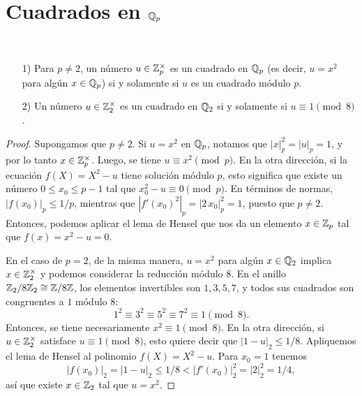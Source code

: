 \documentclass{article}
\numberwithin{equation}{section}
\theoremstyle{definition}
\begin{document}

\section{Cuadrados en $\mathbb{Q}_p$}

\begin{proposicion}
  \label{prop:cuadrados-en-Zp}
  ~

  \begin{enumerate}
  \item[1)] Para $p \ne 2$, un número $u \in \mathbb{Z}_p^\times$ es un cuadrado en
    $\mathbb{Q}_p$ (es decir, $u = x^2$ para algún $x \in \mathbb{Q}_p$) si y solamente si $u$
    es un cuadrado módulo $p$.

  \item[2)] Un número $u\in\mathbb{Z}_2^\times$ es un cuadrado en $\mathbb{Q}_2$ si y solamente
    si $u \equiv 1 \pmod{8}$.
  \end{enumerate}

  \begin{proof}
    Supongamos que $p\ne 2$. Si $u = x^2$ en $\mathbb{Q}_p$, notamos que
    $|x|_p^2 = |u|_p = 1$, y por lo tanto $x \in \mathbb{Z}_p^\times$. Luego, se tiene
    $u \equiv x^2 \pmod{p}$. En la otra dirección, si la ecuación
    $f (X) = X^2 - u$ tiene solución módulo $p$, esto significa que existe
    un número $0 \le x_0 \le p-1$ tal que $x_0^2 - u \equiv 0 \pmod{p}$.
    En términos de normas, $|f (x_0)|_p \le 1/p$, mientras que
    $|f' (x_0)^2|_p = |2\,x_0|^2_p = 1$, puesto que $p \ne 2$. Entonces, podemos
    aplicar el lema de Hensel que nos da un elemento $x\in \mathbb{Z}_p$ tal que
    $f (x) = x^2 - u = 0$.

    En el caso de $p = 2$, de la misma manera, $u = x^2$ para algún $x\in\mathbb{Q}_2$
    implica $x\in \mathbb{Z}_2^\times$ y podemos considerar la reducción módulo $8$.
    En el anillo $\mathbb{Z}_2/8\mathbb{Z}_2 \cong \mathbb{Z}/8\mathbb{Z}$, los elementos invertibles son
    $1, 3, 5, 7$, y todos sus cuadrados son congruentes a $1$ módulo $8$:
    $$1^2 \equiv 3^2 \equiv 5^2 \equiv 7^2 \equiv 1 \pmod{8}.$$
    Entonces, se tiene necesariamente $x^2 \equiv 1 \pmod{8}$. En la otra
    dirección, si $u\in\mathbb{Z}_2^\times$ satisface $u \equiv 1 \pmod{8}$, esto quiere
    decir que $|1-u|_2 \le 1/8$.  Apliquemos el lema de Hensel al polinomio
    $f (X) = X^2 - u$. Para $x_0 = 1$ tenemos
    $$|f (x_0)|_2 = |1-u|_2 \le 1/8 < |f' (x_0)|_2^2 = |2|_2^2 = 1/4,$$
    así que existe $x\in\mathbb{Z}_2$ tal que $u = x^2$.
  \end{proof}
\end{proposicion}
\end{document}

